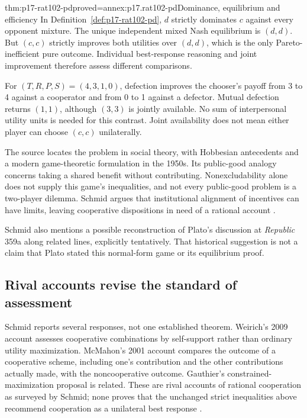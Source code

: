 \begin{hbtheorem}{thm:p17-rat102-pd}{proved=annex:p17.rat102-pd}{Dominance, equilibrium and efficiency}
In Definition~\ref{def:p17-rat102-pd}, \(d\) strictly dominates \(c\)
against every opponent mixture. The unique independent mixed Nash
equilibrium is \((d,d)\). But \((c,c)\) strictly improves both utilities
over \((d,d)\), which is the only Pareto-inefficient pure outcome.
Individual best-response reasoning and joint improvement therefore assess
different comparisons.
\end{hbtheorem}

For \((T,R,P,S)=(4,3,1,0)\), defection improves the chooser's payoff from
3 to 4 against a cooperator and from 0 to 1 against a defector. Mutual
defection returns \((1,1)\), although \((3,3)\) is jointly available.
No sum of interpersonal utility units is needed for this contrast.
Joint availability does not mean either player can choose \((c,c)\)
unilaterally.

The source locates the problem in social theory, with Hobbesian antecedents
and a modern game-theoretic formulation in the 1950s. Its public-good analogy
concerns taking a shared benefit without contributing. Nonexcludability
alone does not supply this game's inequalities, and not every public-good
problem is a two-player dilemma. Schmid argues that institutional alignment
of incentives can have limits, leaving cooperative dispositions in need of
a rational account \parencite[p.~592]{Schmid2021CollectiveRationality}.

Schmid also mentions a possible reconstruction of Plato's discussion at
\emph{Republic} 359a along related lines, explicitly tentatively. That
historical suggestion is not a claim that Plato stated this normal-form
game or its equilibrium proof.

\subsection{Rival accounts revise the standard of assessment}

Schmid reports several responses, not one established theorem. Weirich's
2009 account assesses cooperative combinations by self-support rather than
ordinary utility maximization. McMahon's 2001 account compares the outcome
of a cooperative scheme, including one's contribution and the other
contributions actually made, with the noncooperative outcome. Gauthier's
constrained-maximization proposal is related. These are rival accounts of
rational cooperation as surveyed by Schmid; none proves that the unchanged
strict inequalities above recommend cooperation as a unilateral best
response \parencite[p.~593]{Schmid2021CollectiveRationality}.

